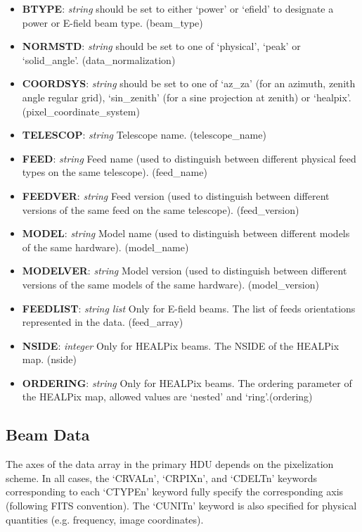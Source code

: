 \documentclass[11pt, oneside]{article}   	%
\begin{document}
\begin{itemize}
\item{\textbf{BTYPE}: \textit{string} should be set to either `power' or `efield' to designate a power or E-field beam type. (beam\_type)}
\item{\textbf{NORMSTD}: \textit{string} should be set to one of `physical', `peak' or `solid\_angle'. (data\_normalization)}
\item{\textbf{COORDSYS}: \textit{string} should be set to one of `az\_za' (for an azimuth, zenith angle regular grid), `sin\_zenith' (for a sine projection at zenith) or `healpix'. (pixel\_coordinate\_system)}
\item{\textbf{TELESCOP}: \textit{string} Telescope name. (telescope\_name)}
\item{\textbf{FEED}: \textit{string} Feed name (used to distinguish between different physical feed types on the same telescope). (feed\_name)}
\item{\textbf{FEEDVER}: \textit{string} Feed version (used to distinguish between different versions of the same feed on the same telescope). (feed\_version)}
\item{\textbf{MODEL}: \textit{string} Model name  (used to distinguish between different models of the same hardware). (model\_name)}
\item{\textbf{MODELVER}: \textit{string} Model version (used to distinguish between different versions of the same models of the same hardware). (model\_version)}
\item{\textbf{FEEDLIST}: \textit{string list} Only for E-field beams. The list of feeds orientations represented in the data. (feed\_array)}
\item{\textbf{NSIDE}: \textit{integer} Only for HEALPix beams. The NSIDE of the HEALPix map. (nside)}
\item{\textbf{ORDERING}: \textit{string} Only for HEALPix beams. The ordering parameter of the HEALPix map, allowed values are `nested' and `ring'.(ordering)}
\end{itemize}

\subsection{Beam Data}
The axes of the data array in the primary HDU depends on the pixelization scheme. In all cases, the `CRVALn', `CRPIXn', and `CDELTn' keywords corresponding to each `CTYPEn' keyword fully specify the corresponding axis (following FITS convention). The `CUNITn' keyword is also specified for physical quantities (e.g. frequency, image coordinates).
\end{document}
